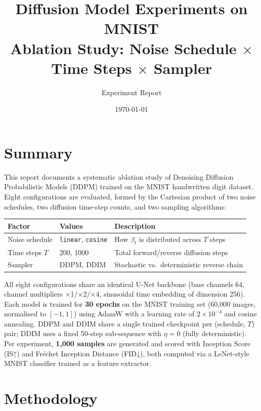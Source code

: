 \documentclass[11pt,a4paper]{article}
\title{\textbf{Diffusion Model Experiments on MNIST}\\[0.4em]
       \large Ablation Study: Noise Schedule $\times$ Time Steps $\times$ Sampler}
\author{Experiment Report}
\date{\today}
\begin{document}
\maketitle
\tableofcontents
\newpage

\section{Summary}

This report documents a systematic ablation study of Denoising Diffusion
Probabilistic Models (DDPM) trained on the MNIST handwritten digit dataset.
Eight configurations are evaluated, formed by the Cartesian product of two
noise schedules, two diffusion time-step counts, and two sampling algorithms:

\begin{center}
\begin{tabular}{lll}
\toprule
\textbf{Factor} & \textbf{Values} & \textbf{Description}\\
\midrule
Noise schedule & \texttt{linear}, \texttt{cosine} & How $\beta_t$ is distributed across $T$ steps\\
Time steps $T$ & 200, 1000 & Total forward/reverse diffusion steps\\
Sampler        & DDPM, DDIM & Stochastic vs.\ deterministic reverse chain\\
\bottomrule
\end{tabular}
\end{center}

All eight configurations share an identical U-Net backbone (base channels 64,
channel multipliers $\times$1/$\times$2/$\times$4, sinusoidal time embedding
of dimension 256). Each model is trained for \textbf{30 epochs} on the MNIST
training set (60,000 images, normalised to $[-1,1]$) using AdamW with a
learning rate of $2\times10^{-4}$ and cosine annealing. DDPM and DDIM share a
single trained checkpoint per (schedule, $T$) pair; DDIM uses a fixed
50-step sub-sequence with $\eta=0$ (fully deterministic). Per experiment,
\textbf{1,000 samples} are generated and scored with Inception Score (IS↑)
and Fréchet Inception Distance (FID↓), both computed via a LeNet-style MNIST
classifier trained as a feature extractor.

\section{Methodology}
\end{document}
